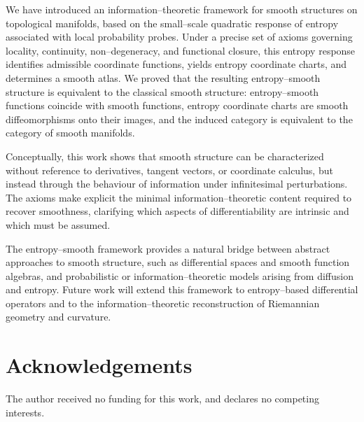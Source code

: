 \documentclass[11pt]{amsart}
\theoremstyle{definition}
\theoremstyle{remark}
\begin{document}
We have introduced an information--theoretic framework for smooth structures on topological manifolds, 
based on the small--scale quadratic response of entropy associated with local probability probes. 
Under a precise set of axioms governing locality, continuity, non--degeneracy, and functional closure, 
this entropy response identifies admissible coordinate functions, yields entropy coordinate charts, 
and determines a smooth atlas. We proved that the resulting entropy--smooth structure is equivalent to 
the classical smooth structure: entropy--smooth functions coincide with smooth functions, entropy 
coordinate charts are smooth diffeomorphisms onto their images, and the induced category is equivalent 
to the category of smooth manifolds.

Conceptually, this work shows that smooth structure can be characterized without reference to derivatives, 
tangent vectors, or coordinate calculus, but instead through the behaviour of information under 
infinitesimal perturbations. The axioms make explicit the minimal information--theoretic content required 
to recover smoothness, clarifying which aspects of differentiability are intrinsic and which must be assumed.

The entropy--smooth framework provides a natural bridge between abstract approaches to smooth structure, 
such as differential spaces and smooth function algebras, and probabilistic or information--theoretic 
models arising from diffusion and entropy. Future work will extend this framework to entropy--based 
differential operators and to the information--theoretic reconstruction of Riemannian geometry and curvature.

\section*{Acknowledgements}
The author received no funding for this work, and declares no competing interests.



\end{document}
